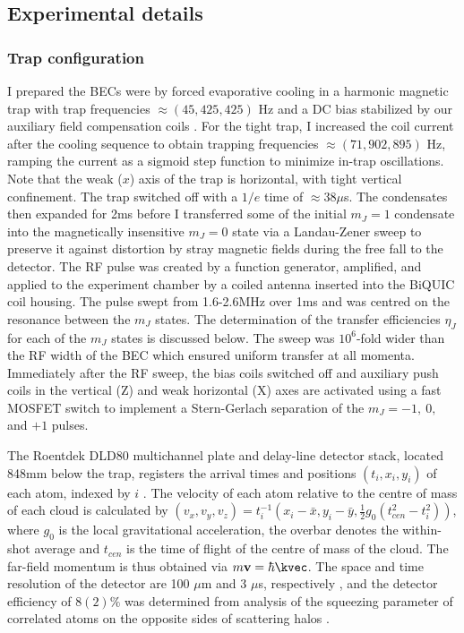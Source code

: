 	


\subsection{Experimental details}
\label{sec:exp_details}
\subsubsection{Trap configuration}

	I prepared the BECs were by forced evaporative cooling in a harmonic magnetic trap with trap frequencies $\approx(45,425,425)$ Hz and a DC bias stabilized by our auxiliary field compensation coils \cite{Dall07,Dedman07}. For the tight trap, I increased the coil current after the cooling sequence to obtain trapping frequencies $\approx(71,902,895)$ Hz, ramping the current as a sigmoid step function to minimize in-trap oscillations. Note that the weak ($x$) axis of the trap is horizontal, with tight vertical confinement. The trap switched off with a $1/e$ time of $\approx38\mu$s. The condensates then expanded for 2ms before I transferred some of the initial $m_J=1$ condensate into the magnetically insensitive $m_J=0$ state via a Landau-Zener sweep to preserve it against distortion by stray magnetic fields during the free fall to the detector. The RF pulse was created by a function generator, amplified, and applied to the experiment chamber by a coiled antenna inserted into the BiQUIC coil housing. The pulse swept from 1.6-2.6MHz over 1ms and was centred on the resonance between the $m_J$ states. The determination of the transfer efficiencies $\eta_J$ for each of the $m_J$ states is discussed below. The sweep was $10^6$-fold wider than the RF width of the BEC which ensured uniform transfer at all momenta. Immediately after the RF sweep, the bias coils switched off and auxiliary push coils in the vertical (Z) and weak horizontal (X) axes are activated using a fast MOSFET switch to implement a Stern-Gerlach separation of the $m_J = -1,~0,$ and $+1$ pulses.

	The Roentdek DLD80 multichannel plate and delay-line detector stack, located 848mm below the trap, registers the arrival times and positions $(t_i,x_i,y_i)$ of each atom, indexed by $i$ \cite{Manning10}. 
	The velocity of each atom relative to the centre of mass of each cloud is calculated by $(v_x,v_y,v_z) = t_{i}^{-1}(x_i-\bar{x},y_i-\bar{y},\tfrac{1}{2}g_0(t_{cen}^2-t_{i}^{2}))$, where $g_0$ is the local gravitational acceleration, the overbar denotes the within-shot average and $t_{cen}$ is the time of flight of the centre of mass of the cloud. 
	The far-field momentum is thus obtained via $m\textbf{v} = \hbar\kvec$.
	The space and time resolution of the detector are 100 $\mu$m and 3 $\mu$s, respectively \cite{Henson18}, and the detector efficiency of $8(2)\%$ was determined from analysis of the squeezing parameter of correlated atoms on the opposite sides of scattering halos \cite{Shin19,Shin20,Jaskula10}. 

